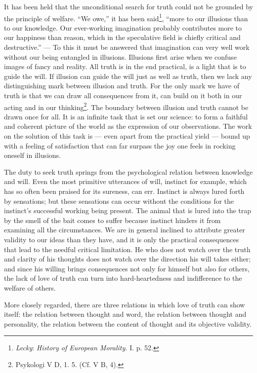 \documentclass[12pt,a4paper,openany]{book}
\newcommand{\opage}[1]{\marginnote{\footnotesize\textit{[#1]}}}
\begin{document}
It has been held that the unconditional search for truth could not be grounded by the principle of welfare. ``We
owe,'' it has been said\footnote[3]{\emph{Lecky}: \textit{History of European Morality.} I. p. 52.}, ``more to our illusions
than to our knowledge. Our ever-working imagination probably contributes more to our happiness than reason, which in
the speculative field is chiefly critical and destructive.'' --- To this it must be answered that imagination can very
well work without our being entangled in illusions. Illusions first arise when we confuse images of fancy and reality.
All truth is in the end practical, is a light that is to guide the will. If illusion can guide the will just as well as
truth, then we lack any distinguishing mark between illusion and truth. For the only mark we have of truth is that we
can draw all consequences from it, can build on it both in our acting and in our thinking\footnote[4]{Psykologi V D, 1.
5. (Cf. V B, 4).}. The boundary between illusion and truth cannot be drawn once for all. It is an infinite task that is
set our science: to form a faithful and coherent picture of the world as the expression of our observations. The work
on the solution of this task is --- even apart from the practical yield --- bound up with a feeling of satisfaction
that can far surpass the joy one feels in rocking oneself in illusions.

\opage{252}The duty to seek truth springs from the psychological relation between knowledge and will. Even the most
primitive utterances of will, instinct for example, which has so often been praised for its sureness, can err.
Instinct is always lured forth by sensations; but these sensations can occur without the conditions for the instinct's
successful working being present. The animal that is lured into the trap by the smell of the bait comes to suffer
because instinct hinders it from examining all the circumstances. We are in general inclined to attribute greater
validity to our ideas than they have, and it is only the practical consequences that lead to the needful critical
limitation. He who does not watch over the truth and clarity of his thoughts does not watch over the direction his will
takes either; and since his willing brings consequences not only for himself but also for others, the lack of love of
truth can turn into hard-heartedness and indifference to the welfare of others.

More closely regarded, there are three relations in which love of truth can show itself: the relation between thought
and word, the relation between thought and personality, the relation between the content of thought and its objective
validity.
\end{document}
